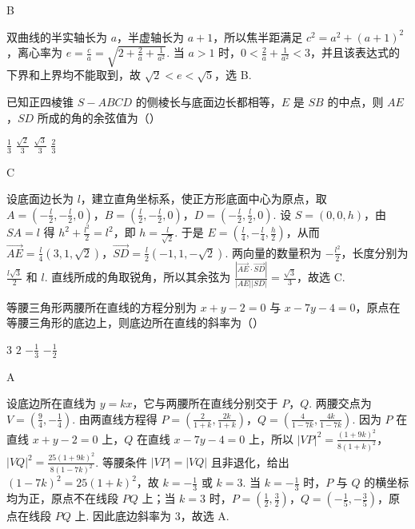 \begin{answer}
B
\end{answer}

\begin{solution}
双曲线的半实轴长为 \(a\)，半虚轴长为 \(a+1\)，所以焦半距满足 \(c^2=a^2+(a+1)^2\)，离心率为 \(e=\frac{c}{a}=\sqrt{2+\frac{2}{a}+\frac{1}{a^2}}\). 当 \(a>1\) 时，\(0<\frac{2}{a}+\frac{1}{a^2}<3\)，并且该表达式的下界和上界均不能取到，故 \(\sqrt{2}<e<\sqrt{5}\)，选 B.
\end{solution}

\begin{problem}
已知正四棱锥 \(S - ABCD\) 的侧棱长与底面边长都相等，\(E\) 是 \(SB\) 的中点，则 \(AE\)，\(SD\) 所成的角的余弦值为（\quad）

\choices
    {\(\frac{1}{3}\)}
    {\(\frac{\sqrt{2}}{3}\)}
    {\(\frac{\sqrt{3}}{3}\)}
    {\(\frac{2}{3}\)}
\end{problem}

\begin{answer}
C
\end{answer}

\begin{solution}
设底面边长为 \(l\)，建立直角坐标系，使正方形底面中心为原点，取 \(A=\left(-\frac l2,-\frac l2,0\right)\)，\(B=\left(\frac l2,-\frac l2,0\right)\)，\(D=\left(-\frac l2,\frac l2,0\right)\). 设 \(S=(0,0,h)\)，由 \(SA=l\) 得 \(h^2+\frac{l^2}{2}=l^2\)，即 \(h=\frac{l}{\sqrt{2}}\). 于是 \(E=\left(\frac l4,-\frac l4,\frac h2\right)\)，从而 \(\overrightarrow{AE}=\frac l4(3,1,\sqrt{2})\)，\(\overrightarrow{SD}=\frac l2(-1,1,-\sqrt{2})\). 两向量的数量积为 \(-\frac{l^2}{2}\)，长度分别为 \(\frac{l\sqrt{3}}{2}\) 和 \(l\). 直线所成的角取锐角，所以其余弦为 \(\frac{|\overrightarrow{AE}\cdot\overrightarrow{SD}|}{|AE||SD|}=\frac{\sqrt{3}}{3}\)，故选 C.
\end{solution}

\begin{problem}
等腰三角形两腰所在直线的方程分别为 \(x + y - 2 = 0\) 与 \(x - 7y - 4 = 0\)，原点在等腰三角形的底边上，则底边所在直线的斜率为（\quad）

\choices
    {\(3\)}
    {\(2\)}
    {\(-\frac{1}{3}\)}
    {\(-\frac{1}{2}\)}
\end{problem}

\begin{answer}
A
\end{answer}

\begin{solution}
设底边所在直线为 \(y=kx\)，它与两腰所在直线分别交于 \(P\)，\(Q\). 两腰交点为 \(V=\left(\frac94,-\frac14\right)\). 由两直线方程得 \(P=\left(\frac{2}{1+k},\frac{2k}{1+k}\right)\)，\(Q=\left(\frac{4}{1-7k},\frac{4k}{1-7k}\right)\). 因为 \(P\) 在直线 \(x+y-2=0\) 上，\(Q\) 在直线 \(x-7y-4=0\) 上，所以
\(|VP|^2=\frac{(1+9k)^2}{8(1+k)^2}\)，\(|VQ|^2=\frac{25(1+9k)^2}{8(1-7k)^2}\).
等腰条件 \(|VP|=|VQ|\) 且非退化，给出 \((1-7k)^2=25(1+k)^2\)，故 \(k=-\frac13\) 或 \(k=3\). 当 \(k=-\frac13\) 时，\(P\) 与 \(Q\) 的横坐标均为正，原点不在线段 \(PQ\) 上；当 \(k=3\) 时，\(P=\left(\frac12,\frac32\right)\)，\(Q=\left(-\frac15,-\frac35\right)\)，原点在线段 \(PQ\) 上. 因此底边斜率为 \(3\)，故选 A.
\end{solution}

